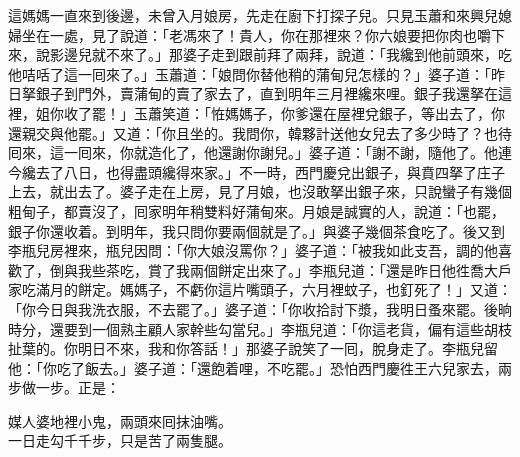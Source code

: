 這媽媽一直來到後邊，未曾入月娘房，先走在廚下打探子兒。只見玉蕭和來興兒媳婦坐在一處，見了說道：「老馮來了！貴人，你在那裡來？你六娘要把你肉也嚼下來，說影邊兒就不來了。」那婆子走到跟前拜了兩拜，說道：「我纔到他前頭來，吃他咭咶了這一囘來了。」玉蕭道：「娘問你替他稍的蒲甸兒怎樣的？」婆子道：「昨日拏銀子到門外，賣蒲甸的賣了家去了，直到明年三月裡纔來哩。銀子我還拏在這裡，姐你收了罷！」玉蕭笑道：「恠媽媽子，你爹還在屋裡兌銀子，等出去了，你還親交與他罷。」又道：「你且坐的。我問你，韓夥計送他女兒去了多少時了？也待囘來，這一囘來，你就造化了，他還謝你謝兒。」婆子道：「謝不謝，隨他了。他連今纔去了八日，也得盡頭纔得來家。」不一時，西門慶兌出銀子，與賁四拏了庄子上去，就出去了。婆子走在上房，見了月娘，也沒敢拏出銀子來，只說蠻子有幾個粗甸子，都賣沒了，囘家明年稍雙料好蒲甸來。月娘是誠實的人，說道：「也罷，銀子你還收着。到明年，我只問你要兩個就是了。」與婆子幾個茶食吃了。後又到李瓶兒房裡來，瓶兒因問：「你大娘沒罵你？」婆子道：「被我如此支吾，調的他喜歡了，倒與我些茶吃，賞了我兩個餅定出來了。」李瓶兒道：「還是昨日他徃喬大戶家吃滿月的餅定。媽媽子，不虧你這片嘴頭子，六月裡蚊子，也釘死了！」又道：「你今日與我洗衣服，不去罷了。」婆子道：「你收拾討下漿，我明日蚤來罷。後晌時分，還要到一個熟主顧人家幹些勾當兒。」李瓶兒道：「你這老貨，偏有這些胡枝扯葉的。你明日不來，我和你答話！」那婆子說笑了一囘，脫身走了。李瓶兒留他：「你吃了飯去。」婆子道：「還飽着哩，不吃罷。」恐怕西門慶徃王六兒家去，兩步做一步。正是：

\begin{myquote}
媒人婆地裡小鬼，兩頭來囘抹油嘴。\\一日走勾千千步，只是苦了兩隻腿。
\end{myquote}

